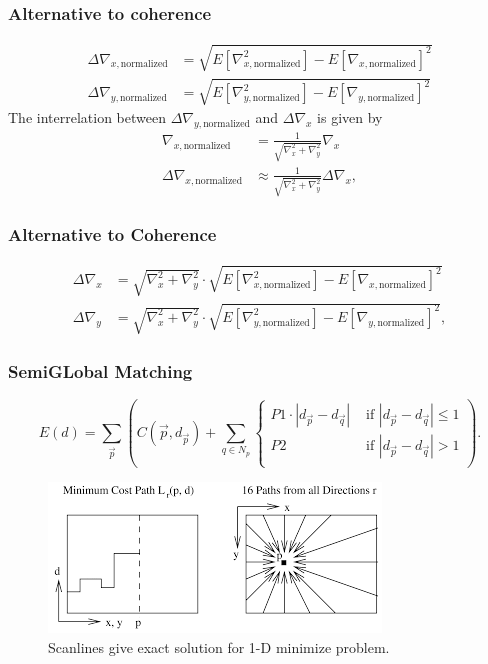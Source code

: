 \documentclass[11pt]{beamer}
\begin{document}
\begin{frame}
\frametitle{Alternative to coherence}
\begin{align}\label{eq:normed_std}
\Delta\nabla_{x, \text{normalized}} &= \sqrt{E[\nabla_{x, \text{normalized}}^2] - E[\nabla_{x, \text{normalized}}]^2}\\
\Delta\nabla_{y, \text{normalized}} &= \sqrt{E[\nabla_{y, \text{normalized}}^2] - E[\nabla_{y, \text{normalized}}]^2}
\end{align}
The interrelation between $\Delta\nabla_{y, \text{normalized}}$ and  $\Delta\nabla_x$ is given by
\begin{align}\label{eq:norm_error}
\nabla_{x, \text{normalized}} &= \frac{1}{\sqrt{\nabla_x^2 + \nabla_y^2}}\nabla_x \\
\Delta \nabla_{x, \text{normalized}} &\approx  \frac{1}{\sqrt{\nabla_x^2 + \nabla_y^2}}\Delta\nabla_x,
\end{align}
\end{frame}

\begin{frame}
\frametitle{Alternative to Coherence}
\begin{align}\label{eq:normed_std_final}
\Delta\nabla_{x} &=  \sqrt{\nabla_x^2 + \nabla_y^2} \cdot \sqrt{E[\nabla_{x, \text{normalized}}^2] - E[\nabla_{x, \text{normalized}}]^2}\\
\Delta\nabla_{y} &= \sqrt{\nabla_x^2 + \nabla_y^2} \cdot \sqrt{E[\nabla_{y, \text{normalized}}^2] - E[\nabla_{y, \text{normalized}}]^2},
\end{align}
\end{frame}



\begin{frame}
\frametitle{SemiGLobal Matching}
\begin{equation}\label{eq:global_sgm_cont}
E(d) = \sum_{\vec p} \left(C(\vec{p}, d_{\vec p}) + \sum_{q\in N_p} 
\begin{cases}
P1\cdot |d_{\vec p} - d_{\vec q}|  & \text{ if }|d_{\vec p} - d_{\vec q}| \leq 1\\
P2 & \text{ if }|d_{\vec p} - d_{\vec q}| > 1\\
\end{cases}  
\right).
\end{equation}
\begin{figure}
	\centering
	\includegraphics[width=0.7\linewidth]{images/sgm_paths}
	\caption[Discrete scanline to continuous scanline]{Scanlines give exact solution for 1-D minimize problem.}
	\label{fig:discretecont}
\end{figure}

\end{frame}
\end{document}
